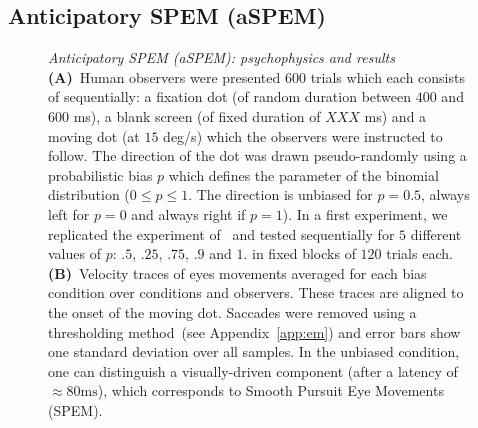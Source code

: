 \documentclass[profile,final,english, draft]{article}%
\newcommand{\ms}{\si{\milli\second}}%
\newcommand{\citep}[1]{\parencite{#1}}
\newcommand{\seeApp}[1]{see Appendix~\ref{app:#1}}
\begin{document}
\subsection{Anticipatory SPEM (aSPEM)}
\begin{figure}%
\caption{\emph{Anticipatory SPEM (aSPEM): psychophysics and results} %
\textbf{(A)}~Human observers were presented $600$ trials %
which each consists of sequentially:
a fixation dot (of random duration between $400$ and $600$ \ms),
a blank screen (of fixed duration of  $XXX$ \ms) and
a moving dot (at $15$ deg/s) which the observers were instructed to follow.
The direction of the dot was drawn pseudo-randomly
using a probabilistic bias $p$ which defines the parameter
of the binomial distribution
($0\leq p\leq 1 $. The direction is unbiased for $p=0.5$,
always left for $p=0$ and always right if $p=1$).
In a first experiment,
we replicated the experiment of~\citep{Montagnini2010} and
tested sequentially for $5$ different values of $p$:
$.5$, $.25$, $.75$, $.9$ and $1.$ 
in fixed blocks of $120$ trials each.
\textbf{(B)}~Velocity traces of eyes movements 
averaged for each bias condition
over conditions and observers.
These traces are aligned to the onset of the moving dot.
Saccades were removed using a thresholding method~(\seeApp{em}) and
error bars show one standard deviation over all samples.
In the unbiased condition, one can distinguish
a visually-driven component (after a latency of $\approx 80 \ms$),
which corresponds to Smooth Pursuit Eye Movements (SPEM).
}
\end{figure}
\end{document}
